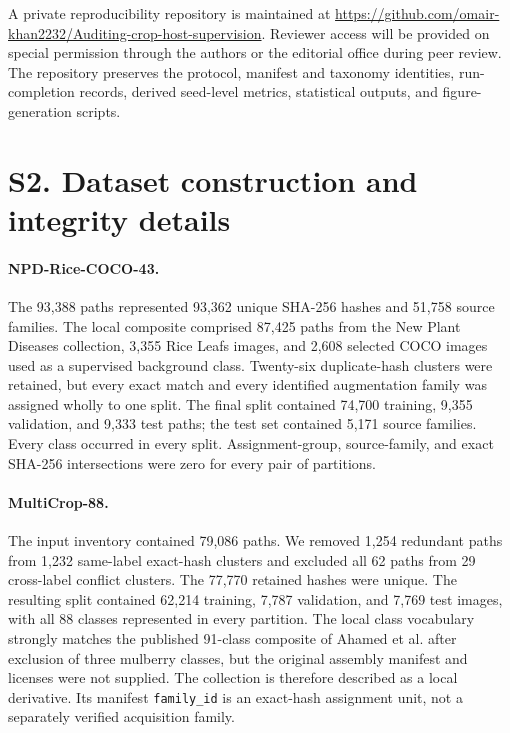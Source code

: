 \documentclass[preprint,12pt]{elsarticle}
\begin{document}
A private reproducibility repository is maintained at
\url{https://github.com/omair-khan2232/Auditing-crop-host-supervision}.
Reviewer access will be provided on special permission through the authors or
the editorial office during peer review. The repository preserves the protocol,
manifest and taxonomy identities, run-completion records, derived seed-level
metrics, statistical outputs, and figure-generation scripts.

\section*{S2. Dataset construction and integrity details}

\paragraph{NPD-Rice-COCO-43.}
The 93,388 paths represented 93,362 unique SHA-256 hashes and 51,758 source
families. The local composite comprised 87,425 paths from the New Plant
Diseases collection, 3,355 Rice Leafs images, and 2,608 selected COCO images
used as a supervised background class. Twenty-six duplicate-hash clusters were
retained, but every exact match and every identified augmentation family was
assigned wholly to one split. The final split contained 74,700 training, 9,355
validation, and 9,333 test paths; the test set contained 5,171 source families.
Every class occurred in every split. Assignment-group, source-family, and exact
SHA-256 intersections were zero for every pair of partitions.

\paragraph{MultiCrop-88.}
The input inventory contained 79,086 paths. We removed 1,254 redundant paths
from 1,232 same-label exact-hash clusters and excluded all 62 paths from 29
cross-label conflict clusters. The 77,770 retained hashes were unique. The
resulting split contained 62,214 training, 7,787 validation, and 7,769 test
images, with all 88 classes represented in every partition. The local class
vocabulary strongly matches the published 91-class composite of Ahamed et al.
after exclusion of three mulberry classes, but the original assembly manifest
and licenses were not supplied. The collection is therefore described as a
local derivative. Its manifest \texttt{family\_id} is an exact-hash assignment
unit, not a separately verified acquisition family.
\end{document}
